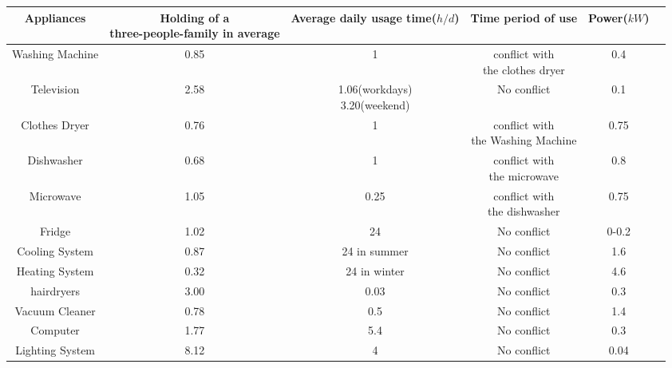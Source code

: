 \documentclass{article}
\begin{document}
\normalsize
\begin{center}
    \begin{tabular}{|c | c |c | c |c  |c|}
        \hline
        \bf Appliances  & \makecell {\bf Holding of a                                                              \\ \bf three-people-family in average} & \makecell{\bf Average daily\\ \bf usage time($h/d$)}  & \bf Time period of use
                        & \bf Power($kW$)                                                                          \\ \hline
        Washing Machine & 0.85                        & 1                        & \makecell{conflict with         \\the clothes dryer} & 0.4 \\ \hline
        Television      & 2.58                        & \makecell{1.06(workdays)                                   \\3.20(weekend)} & No conflict & 0.1 \\ \hline
        Clothes Dryer   & 0.76                        & 1                        & \makecell{conflict with         \\the Washing Machine}& 0.75 \\ \hline
        Dishwasher      & 0.68                        & 1                        & \makecell{conflict with         \\ the microwave}& 0.8\\ \hline
        Microwave       & 1.05                        & 0.25                     & \makecell{conflict with         \\ the dishwasher } & 0.75 \\\hline
        Fridge          & 1.02                        & 24                       & No conflict             & 0-0.2 \\ \hline
        Cooling System  & 0.87                        & 24 in summer             & No conflict             & 1.6   \\ \hline
        Heating System  & 0.32                        & 24 in winter             & No conflict             & 4.6   \\ \hline
        hairdryers      & 3.00                        & 0.03                     & No conflict             & 0.3   \\ \hline
        Vacuum Cleaner  & 0.78                        & 0.5                      & No conflict             & 1.4   \\ \hline
        Computer        & 1.77                        & 5.4                      & No conflict             & 0.3   \\\hline
        Lighting System & 8.12                        & 4                        & No conflict             & 0.04  \\ \hline
    \end{tabular}
\end{center}
\end{document}
